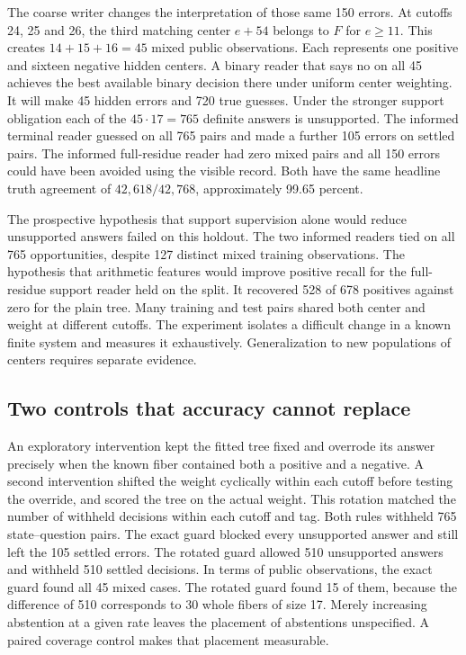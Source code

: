 \documentclass[12pt,letterpaper]{article}
\begin{document}
The coarse writer changes the interpretation of those same 150 errors. At cutoffs 24, 25 and 26, the third matching center \(e+54\) belongs to \(F\) for \(e\geq11\). This creates \(14+15+16=45\) mixed public observations. Each represents one positive and sixteen negative hidden centers. A binary reader that says no on all 45 achieves the best available binary decision there under uniform center weighting. It will make 45 hidden errors and 720 true guesses. Under the stronger support obligation each of the \(45\cdot17=765\) definite answers is unsupported. The informed terminal reader guessed on all 765 pairs and made a further 105 errors on settled pairs. The informed full-residue reader had zero mixed pairs and all 150 errors could have been avoided using the visible record. Both have the same headline truth agreement of \(42{,}618/42{,}768\), approximately 99.65 percent.

The prospective hypothesis that support supervision alone would reduce unsupported answers failed on this holdout. The two informed readers tied on all 765 opportunities, despite 127 distinct mixed training observations. The hypothesis that arithmetic features would improve positive recall for the full-residue support reader held on the split. It recovered 528 of 678 positives against zero for the plain tree. Many training and test pairs shared both center and weight at different cutoffs. The experiment isolates a difficult change in a known finite system and measures it exhaustively. Generalization to new populations of centers requires separate evidence.

\subsection{Two controls that accuracy cannot replace}

An exploratory intervention kept the fitted tree fixed and overrode its answer precisely when the known fiber contained both a positive and a negative. A second intervention shifted the weight cyclically within each cutoff before testing the override, and scored the tree on the actual weight. This rotation matched the number of withheld decisions within each cutoff and tag. Both rules withheld 765 state--question pairs. The exact guard blocked every unsupported answer and still left the 105 settled errors. The rotated guard allowed 510 unsupported answers and withheld 510 settled decisions. In terms of public observations, the exact guard found all 45 mixed cases. The rotated guard found 15 of them, because the difference of 510 corresponds to 30 whole fibers of size 17. Merely increasing abstention at a given rate leaves the placement of abstentions unspecified. A paired coverage control makes that placement measurable.
\end{document}
